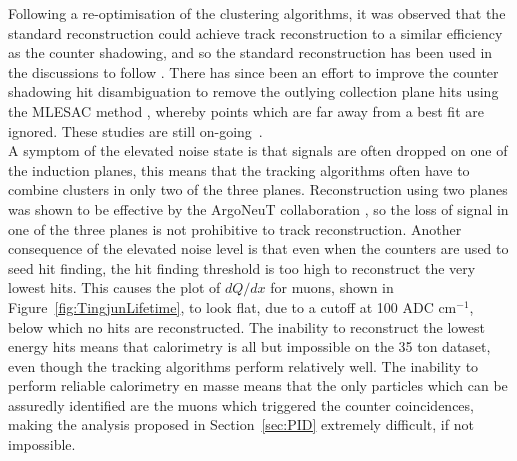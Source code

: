 Following a re-optimisation of the clustering algorithms, it was observed that the standard reconstruction could achieve track reconstruction to a similar efficiency as the counter shadowing, and so the standard reconstruction has been used in the discussions to follow \citep{TingjunClustering}. There has since been an effort to improve the counter shadowing hit disambiguation to remove the outlying collection plane hits using the MLESAC method \citep{MLESAC}, whereby points which are far away from a best fit are ignored. These studies are still on-going~\citep{MattMLESAC}. \\

A symptom of the elevated noise state is that signals are often dropped on one of the induction planes, this means that the tracking algorithms often have to combine clusters in only two of the three planes. Reconstruction using two planes was shown to be effective by the ArgoNeuT collaboration \citep{ArgoNeuT}, so the loss of signal in one of the three planes is not prohibitive to track reconstruction. Another consequence of the elevated noise level is that even when the counters are used to seed hit finding, the hit finding threshold is too high to reconstruct the very lowest hits. This causes the plot of $dQ/dx$ for muons, shown in Figure~\ref{fig:TingjunLifetime}, to look flat, due to a cutoff at 100 ADC cm$^{-1}$, below which no hits are reconstructed. The inability to reconstruct the lowest energy hits means that calorimetry is all but impossible on the 35 ton dataset, even though the tracking algorithms perform relatively well. The inability to perform reliable calorimetry en masse means that the only particles which can be assuredly identified are the muons which triggered the counter coincidences, making the analysis proposed in Section~\ref{sec:PID} extremely difficult, if not impossible. \\

